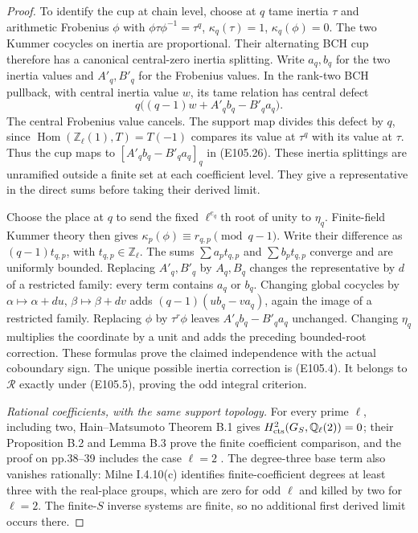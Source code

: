 \begin{proof}
To identify the cup at chain level, choose at $q$ tame
inertia $\tau$ and arithmetic Frobenius $\phi$ with
$\phi\tau\phi^{-1}=\tau^q$,
$\kappa_q(\tau)=1$, $\kappa_q(\phi)=0$.
The two Kummer cocycles on inertia are proportional.
Their alternating BCH cup therefore has a canonical
central-zero inertia splitting.  Write
$a_q,b_q$ for the two inertia values and $A'_q,B'_q$
for the Frobenius values.  In the rank-two BCH pullback,
with central inertia value $w$, its tame relation has
central defect
\[
             q\bigl((q-1)w+A'_qb_q-B'_qa_q\bigr).
 \tag{E105.27}
\]
The central Frobenius value cancels.
The support map divides this defect by $q$, since
$\operatorname{Hom}(\mathbb Z_\ell(1),T)=T(-1)$
compares its value at $\tau^q$ with its value at $\tau$.
Thus the cup maps to $[A'_qb_q-B'_qa_q]_q$ in (E105.26).
These inertia splittings are unramified outside a finite
set at each coefficient level.  They give a representative
in the direct sums before taking their derived limit.

Choose the place at $q$ to send the fixed
$\ell^{e_q}$th root of unity to $\eta_q$.
Finite-field Kummer theory then gives
$\kappa_p(\phi)\equiv r_{q,p}\pmod{q-1}$.
Write their difference as $(q-1)t_{q,p}$, with
$t_{q,p}\in\mathbb Z_\ell$.
The sums $\sum a_pt_{q,p}$ and $\sum b_pt_{q,p}$
converge and are uniformly bounded.
Replacing $A'_q,B'_q$ by $A_q,B_q$ changes the
representative by $d$ of a restricted family: every
term contains $a_q$ or $b_q$.
Changing global cocycles by
$\alpha\mapsto\alpha+du$, $\beta\mapsto\beta+dv$
adds $(q-1)(ub_q-va_q)$, again the image of a
restricted family.  Replacing $\phi$ by $\tau^r\phi$
leaves $A'_qb_q-B'_qa_q$ unchanged.
Changing $\eta_q$ multiplies the coordinate by a unit
and adds the preceding bounded-root correction.
These formulas prove the claimed independence with
the actual coboundary sign.
The unique possible inertia correction is (E105.4).
It belongs to $\mathcal R$ exactly under (E105.5),
proving the odd integral criterion.

\emph{Rational coefficients, with the same support topology.}
For every prime $\ell$, including two,
Hain--Matsumoto Theorem B.1 gives
$H^2_{\rm cts}(G_S,\mathbb Q_\ell(2))=0$;
their Proposition B.2 and Lemma B.3 prove the finite
coefficient comparison, and the proof on pp.38--39
includes the case $\ell=2$ \cite{E_HainMatsumoto}.
The degree-three base term also vanishes rationally:
Milne I.4.10(c) identifies finite-coefficient degrees
at least three with the real-place groups, which are
zero for odd $\ell$ and killed by two for $\ell=2$.
The finite-$S$ inverse systems are finite, so no
additional first derived limit occurs there.


\end{proof}
